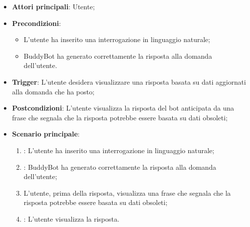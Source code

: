 \begin{itemize}
    \item \textbf{Attori principali}: Utente;
    \item \textbf{Precondizioni}: 
    \begin{itemize}
        \item L'utente ha inserito una interrogazione in linguaggio naturale;
        \item BuddyBot ha generato correttamente la risposta alla domanda dell'utente.
    \end{itemize}
    \item \textbf{Trigger}: L'utente desidera visualizzare una risposta basata su dati aggiornati alla domanda che ha posto;
    \item \textbf{Postcondizioni}: L'utente visualizza la risposta del bot anticipata da una frase che segnala che la
    risposta potrebbe essere basata su dati obsoleti;
    \item \textbf{Scenario principale}: 
    \begin{enumerate}
        \item {}: L'utente ha inserito una interrogazione in linguaggio naturale;
        \item {}: BuddyBot ha generato correttamente la risposta alla domanda dell'utente;
        \item L'utente, prima della risposta, visualizza una frase che segnala che la risposta potrebbe essere basata su dati obsoleti;
        \item {}: L'utente visualizza la risposta.
    \end{enumerate}
\end{itemize}